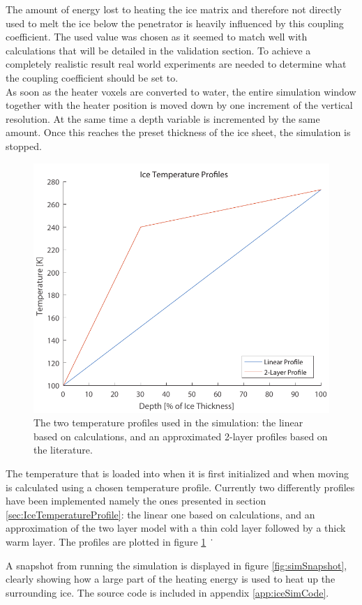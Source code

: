 \noindent
The amount of energy lost to heating the ice matrix and therefore not directly used to melt the ice below the penetrator is heavily influenced by this coupling coefficient. The used value was chosen as it seemed to match well with calculations that will be detailed in the validation section. To achieve a completely realistic result real world experiments are needed to determine what the coupling coefficient should be set to.\\

\noindent
As soon as the heater voxels are converted to water, the entire simulation window together with the heater position is moved down by one increment of the vertical resolution. At the same time a depth variable is incremented by the same amount. Once this reaches the preset thickness of the ice sheet, the simulation is stopped. \\

\begin{figure}[ht]
	\centering
	\includegraphics[width=.5\textwidth]{figures/LAMC/iceTempProfiles.pdf}
	\caption{The two temperature profiles used in the simulation: the linear based on calculations, and an approximated 2-layer profiles based on the literature.}
	\label{fig:iceTempProfiles}
\end{figure}

\noindent
The temperature that is loaded into when it is first initialized and when moving is calculated using a chosen temperature profile. Currently two differently profiles have been implemented namely the ones presented in section \ref{sec:IceTemperatureProfile}: the linear one based on calculations, and an approximation of the two layer model with a thin cold layer followed by a thick warm layer. The profiles are plotted in figure \ref{fig:iceTempProfiles} \.\

\noindent 
A snapshot from running the simulation is displayed in figure \ref{fig:simSnapshot}, clearly showing how a large part of the heating energy is used to heat up the surrounding ice. The source code is included in appendix \ref{app:iceSimCode}.


